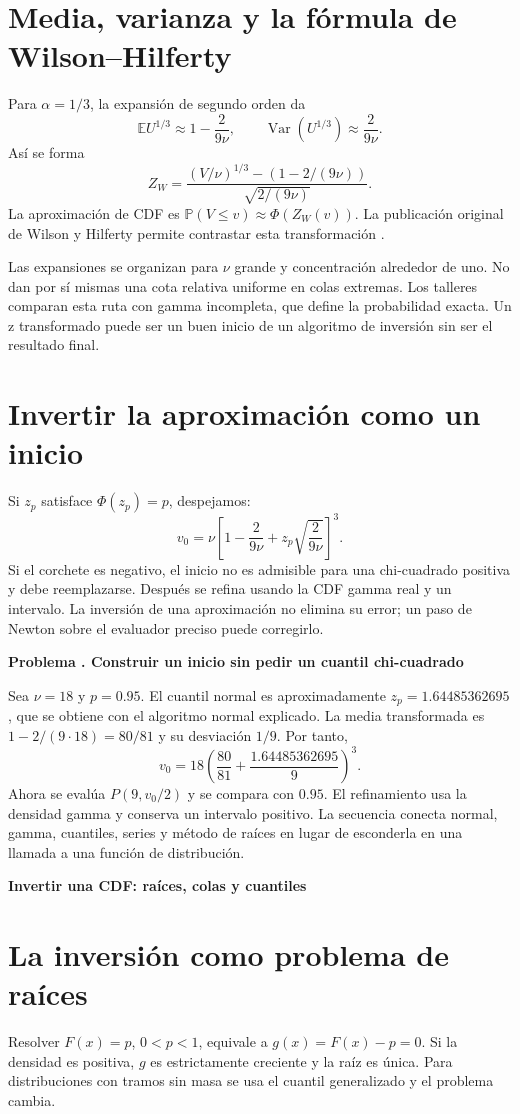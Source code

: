 \documentclass[11pt,a4paper]{article}
\newcommand{\E}{\mathbb E}
\newcommand{\Prob}{\mathbb P}
\DeclareMathOperator{\Var}{Var}
\theoremstyle{definition}
\newcommand{\parte}[1]{\par\bigskip\Needspace{8\baselineskip}\begin{center}{\Large\bfseries\color{azul}#1}\end{center}}
\newcounter{problema}
\newenvironment{resuelto}[1]{\refstepcounter{problema}\par\medskip\Needspace{6\baselineskip}\textbf{Problema \theproblema. #1}\par}{\par\medskip}
\begin{document}
\section{Media, varianza y la fórmula de Wilson--Hilferty}
Para $\alpha=1/3$, la expansión de segundo orden da
\[
\E U^{1/3}\approx1-\frac{2}{9\nu},\qquad
\Var(U^{1/3})\approx\frac{2}{9\nu}.
\]
Así se forma
\[
Z_W=\frac{(V/\nu)^{1/3}-(1-2/(9\nu))}
{\sqrt{2/(9\nu)}}.
\]
La aproximación de CDF es
$\Prob(V\le v)\approx\Phi(Z_W(v))$.
La publicación original de Wilson y Hilferty permite contrastar esta transformación \cite{wilsonnuevo}.

Las expansiones se organizan para $\nu$ grande y concentración alrededor de uno.
No dan por sí mismas una cota relativa uniforme en colas extremas.
Los talleres comparan esta ruta con gamma incompleta, que define la probabilidad exacta.
Un z transformado puede ser un buen inicio de un algoritmo de inversión sin ser el resultado final.

\section{Invertir la aproximación como un inicio}
Si $z_p$ satisface $\Phi(z_p)=p$, despejamos:
\[
v_0=\nu\left[1-\frac{2}{9\nu}
+z_p\sqrt{\frac{2}{9\nu}}\right]^3.
\]
Si el corchete es negativo, el inicio no es admisible para una chi-cuadrado positiva y debe reemplazarse.
Después se refina usando la CDF gamma real y un intervalo.
La inversión de una aproximación no elimina su error; un paso de Newton sobre el evaluador preciso puede corregirlo.

\begin{resuelto}{Construir un inicio sin pedir un cuantil chi-cuadrado}
Sea $\nu=18$ y $p=0.95$. El cuantil normal es aproximadamente $z_p=1.64485362695$, que se obtiene con el algoritmo normal explicado.
La media transformada es $1-2/(9\cdot18)=80/81$ y su desviación $1/9$.
Por tanto,
\[
v_0=18\left(\frac{80}{81}+\frac{1.64485362695}{9}\right)^3.
\]
Ahora se evalúa $P(9,v_0/2)$ y se compara con $0.95$.
El refinamiento usa la densidad gamma y conserva un intervalo positivo.
La secuencia conecta normal, gamma, cuantiles, series y método de raíces en lugar de esconderla en una llamada a una función de distribución.
\end{resuelto}



\parte{Invertir una CDF: raíces, colas y cuantiles}
\section{La inversión como problema de raíces}
Resolver $F(x)=p$, $0<p<1$, equivale a $g(x)=F(x)-p=0$. Si la densidad es positiva, $g$ es estrictamente creciente y la raíz es única. Para distribuciones con tramos sin masa se usa el cuantil generalizado y el problema cambia.
\end{document}
